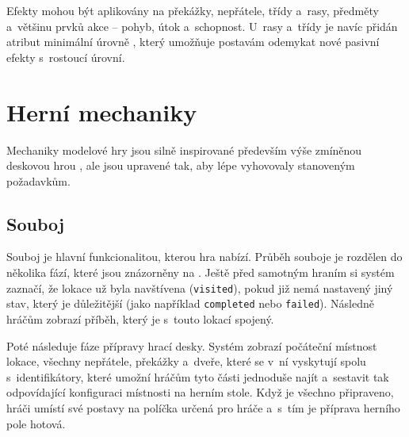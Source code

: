 Efekty mohou být aplikovány na překážky, nepřátele, třídy a~rasy, předměty a~většinu prvků akce -- pohyb, útok a~schopnost. U~rasy a~třídy je navíc přidán atribut minimální úrovně , který umožňuje postavám odemykat nové pasivní efekty s~rostoucí úrovní.


\section{Herní mechaniky}
\label{sec:design_mechanics}

Mechaniky modelové hry jsou silně inspirované především výše zmíněnou deskovou hrou , ale jsou upravené tak, aby lépe vyhovovaly stanoveným požadavkům.


\subsection{Souboj}
\label{subsec:design_encounter}

Souboj je hlavní funkcionalitou, kterou hra nabízí. Průběh souboje je rozdělen do několika fází, které jsou znázorněny na . Ještě před samotným hraním si systém zaznačí, že lokace už byla navštívena (\texttt{visited}), pokud již nemá nastavený jiný stav, který je důležitější (jako například \texttt{completed} nebo \texttt{failed}). Následně hráčům zobrazí příběh, který je s~touto lokací spojený.

Poté následuje fáze přípravy hrací desky. Systém zobrazí počáteční místnost lokace, všechny nepřátele, překážky a~dveře, které se v~ní vyskytují spolu s~identifikátory, které umožní hráčům tyto části jednoduše najít a~sestavit tak odpovídající konfiguraci místnosti na herním stole. Když je všechno připraveno, hráči umístí své postavy na políčka určená pro hráče a~s~tím je příprava herního pole hotová.

